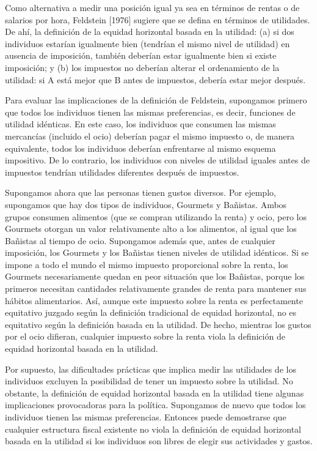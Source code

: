 \documentclass[10pt,a4paper]{article}
\begin{document}
Como alternativa a medir una posición igual ya sea en términos de rentas o de salarios por hora, Feldstein [1976] sugiere que se defina en términos de utilidades. De ahí, la definición de la equidad horizontal basada en la utilidad: (a) si dos individuos estarían igualmente bien (tendrían el mismo nivel de utilidad) en ausencia de imposición, también deberían estar igualmente bien si existe imposición; y (b) los impuestos no deberían alterar el ordenamiento de la utilidad: si A está mejor que B antes de impuestos, debería estar mejor después.

Para evaluar las implicaciones de la definición de Feldstein, supongamos primero que todos los individuos tienen las mismas preferencias, es decir, funciones de utilidad idénticas. En este caso, los individuos que consumen las mismas mercancías (incluido el ocio) deberían pagar el mismo impuesto o, de manera equivalente, todos los individuos deberían enfrentarse al mismo esquema impositivo. De lo contrario, los individuos con niveles de utilidad iguales antes de impuestos tendrían utilidades diferentes después de impuestos.

Supongamos ahora que las personas tienen gustos diversos. Por ejemplo, supongamos que hay dos tipos de individuos, Gourmets y Bañistas. Ambos grupos consumen alimentos (que se compran utilizando la renta) y ocio, pero los Gourmets otorgan un valor relativamente alto a los alimentos, al igual que los Bañistas al tiempo de ocio. Supongamos además que, antes de cualquier imposición, los Gourmets y los Bañistas tienen niveles de utilidad idénticos. Si se impone a todo el mundo el mismo impuesto proporcional sobre la renta, los Gourmets necesariamente quedan en peor situación que los Bañistas, porque los primeros necesitan cantidades relativamente grandes de renta para mantener sus hábitos alimentarios. Así, aunque este impuesto sobre la renta es perfectamente equitativo juzgado según la definición tradicional de equidad horizontal, no es equitativo según la definición basada en la utilidad. De hecho, mientras los gustos por el ocio difieran, cualquier impuesto sobre la renta viola la definición de equidad horizontal basada en la utilidad.

Por supuesto, las dificultades prácticas que implica medir las utilidades de los individuos excluyen la posibilidad de tener un impuesto sobre la utilidad. No obstante, la definición de equidad horizontal basada en la utilidad tiene algunas implicaciones provocadoras para la política. Supongamos de nuevo que todos los individuos tienen las mismas preferencias. Entonces puede demostrarse que cualquier estructura fiscal existente no viola la definición de equidad horizontal basada en la utilidad si los individuos son libres de elegir sus actividades y gastos.
\end{document}
